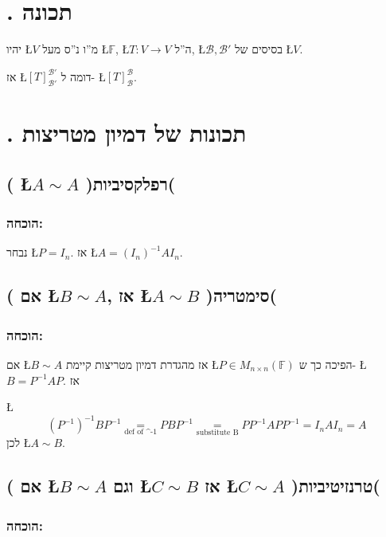 \documentclass[english,hebrew]{article}
\newcommand{\sqrmn}{M_{n\times n}(\mathbb{F})}
\begin{document}
\section{{\endL}. תכונה}

יהיו \L{$V$} מ\textquotedblright ו נ\textquotedblright ס מעל \L{$\mathbb{F}$},
\L{$T:V\rightarrow V$} ה\textquotedblright ל, \L{$\mathcal{B},\mathcal{B}'$}
בסיסים של \L{$V$}.

אז \L{$[T]_{\mathcal{B}'}^{\mathcal{B}'}$} דומה ל- \L{$[T]_{\mathcal{B}}^{\mathcal{B}}$}.

\section{{\endL}. תכונות של דמיון מטריצות}

\subsection{{\endL}( \L{$A\sim A$} )רפלקסיביות(}

\subsubsection{הוכחה:}

נבחר \L{$P=I_{n}$}. אז \L{$A=\left(I_{n}\right)^{-1}AI_{n}$}.

\subsection{{\endL}( אם \L{$B\sim A$}, אז \L{$A\sim B$} )סימטריה(}

\subsubsection{הוכחה:}

אם \L{$B\sim A$} אז מהגדרת דמיון מטריצות קיימת \L{$P\in\sqrmn$}
הפיכה כך ש- \L{$B=P^{-1}AP$}. אז

\L{%
\[
(P^{-1})^{-1}BP^{-1}\underset{\text{def of \textasciicircum-1}}{=}PBP^{-1}\underset{\text{substitute B}}{=}PP^{-1}APP^{-1}=I_{n}AI_{n}=A
\]
}%
לכן \L{$A\sim B$}.

\subsection{{\endL}( אם \L{$B\sim A$} וגם \L{$C\sim B$} אז \L{$C\sim A$}
)טרנזיטיביות(}

\subsubsection{הוכחה:}
\end{document}
